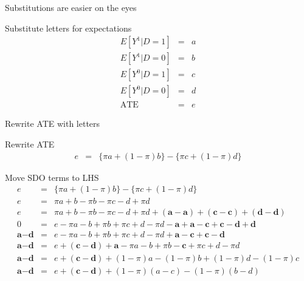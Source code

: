 \documentclass{beamer}
\begin{document}
\begin{frame}{Substitutions are easier on the eyes}



  \begin{block}{Substitute letters for expectations}
    \begin{eqnarray*}
      E[Y^1|D=1] &=& a  \\
      E[Y^1|D=0] &=& b  \\
      E[Y^0|D=1] &=& c  \\
      E[Y^0|D=0] &=& d  \\
      \text{ATE} &=& e
    \end{eqnarray*}
  \end{block}


\end{frame}

\begin{frame}{Rewrite ATE with letters}

  \begin{block}{Rewrite ATE}
    \begin{eqnarray*}
      e&=&\{\pi{a} + (1-\pi)b\} - \{\pi{c} + (1-\pi)d\}
    \end{eqnarray*}
  \end{block}

\end{frame}

\begin{frame}[plain]

  \begin{block}{Move SDO terms to LHS}
    \begin{eqnarray*}
      e&=&\{\pi{a} + (1-\pi)b\} - \{\pi{c} + (1-\pi)d\}  \\
      e&=&\pi{a} + b - \pi{b} - \pi{c} - d + \pi{d}  \\
      e&=&\pi{a} + b - \pi{b} - \pi{c} - d + \pi{d} + (\textbf{a} - \textbf{a}) + (\textbf{c} - \textbf{c}) + (\textbf{d} - \textbf{d})  \\
      0&=&e-\pi{a} - b + \pi{b} + \pi{c} + d - \pi{d} - \textbf{a} + \textbf{a} - \textbf{c} + \textbf{c} - \textbf{d} + \textbf{d}  \\
      \textbf{a}-\textbf{d}&=&e-\pi{a} - b + \pi{b} + \pi{c} + d - \pi{d}  + \textbf{a} - \textbf{c} + \textbf{c} - \textbf{d}  \\
      \textbf{a}-\textbf{d}&=&e  + (\textbf{c} - \textbf{d}) + \textbf{a}-\pi{a} - b + \pi{b} - \textbf{c} + \pi{c} + d - \pi{d} \\
      \textbf{a}-\textbf{d}&=&e  + (\textbf{c} - \textbf{d}) + (1-\pi)a -(1-\pi)b + (1-\pi)d - (1-\pi)c  \\
      \textbf{a}-\textbf{d}&=&e  + (\textbf{c} - \textbf{d}) + (1-\pi)(a-c) -(1-\pi)(b-d)
    \end{eqnarray*}
  \end{block}


\end{frame}
\end{document}
